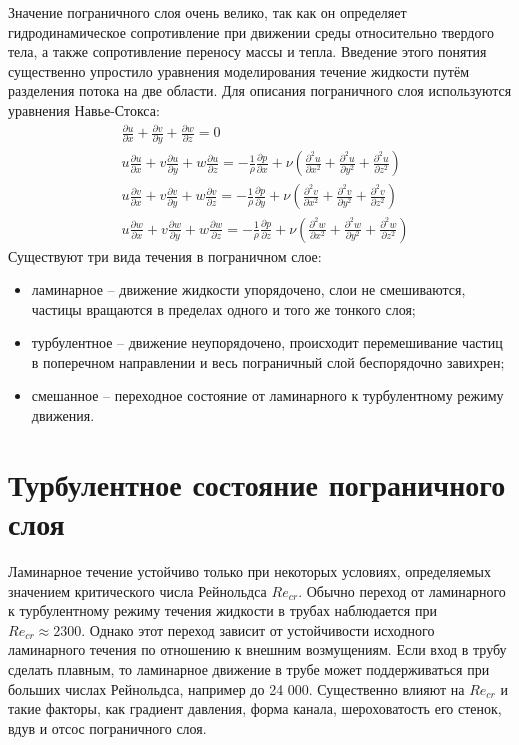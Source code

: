 	Значение пограничного слоя очень велико, так как он определяет гидродинамическое сопротивление при движении среды относительно твердого тела, а также сопротивление переносу массы и тепла. Введение этого понятия существенно упростило уравнения моделирования течение жидкости путём разделения потока на две области. Для описания пограничного слоя используются уравнения Навье-Стокса:
	\begin{align}
		& \frac{\partial u}{\partial x} + \frac{\partial v}{\partial y} + \frac{\partial w}{\partial z} = 0 \nonumber\\
		& u\frac{\partial u}{\partial x} + v\frac{\partial u}{\partial y} + w\frac{\partial u}{\partial z} = -\frac{1}{\rho}\frac{\partial p}{\partial x} + \nu(\frac{\partial^2 u}{\partial x^2} + \frac{\partial^2 u}{\partial y^2} + \frac{\partial^2 u}{\partial z^2}) \nonumber\\
		& u\frac{\partial v}{\partial x} + v\frac{\partial v}{\partial y} + w\frac{\partial v}{\partial z} = -\frac{1}{\rho}\frac{\partial p}{\partial y} + \nu(\frac{\partial^2 v}{\partial x^2} + \frac{\partial^2 v}{\partial y^2} + \frac{\partial^2 v}{\partial z^2})\nonumber\\
		& u\frac{\partial w}{\partial x} + v\frac{\partial w}{\partial y} + w\frac{\partial w}{\partial z} = -\frac{1}{\rho}\frac{\partial p}{\partial z} + \nu(\frac{\partial^2 w}{\partial x^2} + \frac{\partial^2 w}{\partial y^2} + \frac{\partial^2 w}{\partial z^2})
	\end{align}
	Существуют три вида течения в пограничном слое:
	\begin{itemize}
		\item ламинарное -- движение жидкости упорядочено, слои не смешиваются, частицы вращаются в пределах одного и того же тонкого слоя;
		\item турбулентное -- движение неупорядочено, происходит перемешивание частиц в поперечном направлении и весь пограничный слой беспорядочно завихрен;
		\item смешанное -- переходное состояние от ламинарного к турбулентному режиму движения.
	\end{itemize}

\section{Турбулентное состояние пограничного слоя}
	Ламинарное течение устойчиво только при некоторых условиях, определяемых значением критического числа Рейнольдса $Re_{cr}$. Обычно переход от ламинарного к турбулентному режиму течения жидкости в трубах наблюдается при $Re_{cr} \approx 2300$. Однако этот переход зависит от устойчивости исходного ламинарного течения по отношению к внешним возмущениям. Если вход в трубу сделать плавным, то ламинарное движение в трубе может поддерживаться при больших числах Рейнольдса, например до 24 000. Существенно влияют на $Re_{cr}$ и такие факторы, как градиент давления, форма канала, шероховатость его стенок, вдув и отсос пограничного слоя. 
	
